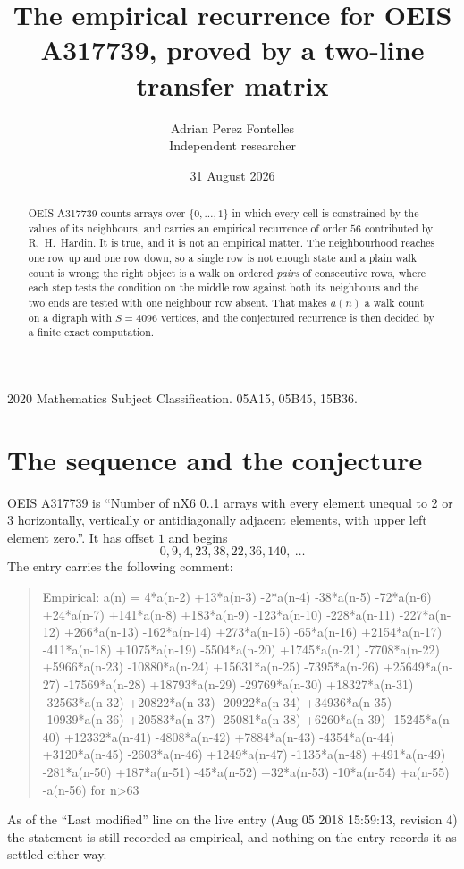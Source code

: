 \documentclass[11pt,a4paper]{article}
\title{The empirical recurrence for OEIS A317739, proved by a two-line transfer matrix}
\author{Adrian Perez Fontelles\\ \small Independent researcher}
\date{31 August 2026}
\theoremstyle{plain}
\theoremstyle{definition}
\begin{document}
\maketitle

\begin{abstract}
OEIS A317739 counts arrays over $\{0,\dots,1\}$ in which every cell is constrained by the
values of its neighbours, and carries an empirical recurrence of order $56$ contributed
by R.~H.~Hardin. It is true, and it is not an empirical matter. The neighbourhood reaches one
row up and one row down, so a single row is not enough state and a plain walk count
is wrong; the right object is a walk on ordered \emph{pairs} of consecutive rows, where
each step tests the condition on the middle row against both its neighbours and the two
ends are tested with one neighbour row absent. That makes $a(n)$ a walk count on a digraph
with $S=4096$ vertices, and the conjectured recurrence is then decided by a finite exact
computation.
\end{abstract}

\noindent\small 2020 Mathematics Subject Classification. 05A15, 05B45, 15B36.\normalsize

\section{The sequence and the conjecture}

OEIS A317739 is ``Number of nX6 0..1 arrays with every element unequal to 2 or 3 horizontally, vertically or antidiagonally adjacent elements, with upper left element zero.''. It has offset $1$ and begins
\[
0, 9, 4, 23, 38, 22, 36, 140,\ \dots
\]
The entry carries the following comment:
\begin{quote}\small
Empirical: a(n) = 4*a(n-2) +13*a(n-3) -2*a(n-4) -38*a(n-5) -72*a(n-6) +24*a(n-7) +141*a(n-8) +183*a(n-9) -123*a(n-10) -228*a(n-11) -227*a(n-12) +266*a(n-13) -162*a(n-14) +273*a(n-15) -65*a(n-16) +2154*a(n-17) -411*a(n-18) +1075*a(n-19) -5504*a(n-20) +1745*a(n-21) -7708*a(n-22) +5966*a(n-23) -10880*a(n-24) +15631*a(n-25) -7395*a(n-26) +25649*a(n-27) -17569*a(n-28) +18793*a(n-29) -29769*a(n-30) +18327*a(n-31) -32563*a(n-32) +20822*a(n-33) -20922*a(n-34) +34936*a(n-35) -10939*a(n-36) +20583*a(n-37) -25081*a(n-38) +6260*a(n-39) -15245*a(n-40) +12332*a(n-41) -4808*a(n-42) +7884*a(n-43) -4354*a(n-44) +3120*a(n-45) -2603*a(n-46) +1249*a(n-47) -1135*a(n-48) +491*a(n-49) -281*a(n-50) +187*a(n-51) -45*a(n-52) +32*a(n-53) -10*a(n-54) +a(n-55) -a(n-56) for n>63
\end{quote}
As of the ``Last modified'' line on the live entry (Aug 05 2018 15:59:13, revision 4) the statement is
still recorded as empirical, and nothing on the entry records it as settled either way.
\end{document}
